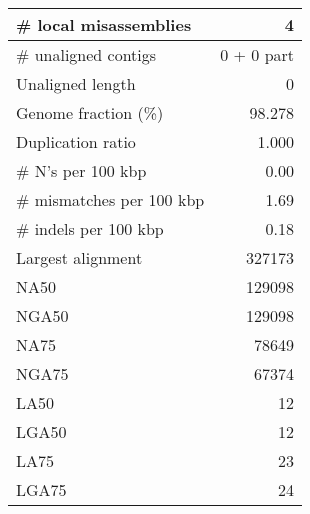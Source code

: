 \documentclass[12pt,a4paper]{article}
\begin{document}
\begin{table}[ht]
\begin{center}
\begin{tabular}{|l*{1}{|r}|}
\# local misassemblies & 4 \\ \hline
\# unaligned contigs & 0 + 0 part \\ \hline
Unaligned length & 0 \\ \hline
Genome fraction (\%) & 98.278 \\ \hline
Duplication ratio & 1.000 \\ \hline
\# N's per 100 kbp & 0.00 \\ \hline
\# mismatches per 100 kbp & 1.69 \\ \hline
\# indels per 100 kbp & 0.18 \\ \hline
Largest alignment & 327173 \\ \hline
NA50 & 129098 \\ \hline
NGA50 & 129098 \\ \hline
NA75 & 78649 \\ \hline
NGA75 & 67374 \\ \hline
LA50 & 12 \\ \hline
LGA50 & 12 \\ \hline
LA75 & 23 \\ \hline
LGA75 & 24 \\ \hline
\end{tabular}
\end{center}
\end{table}
\end{document}
